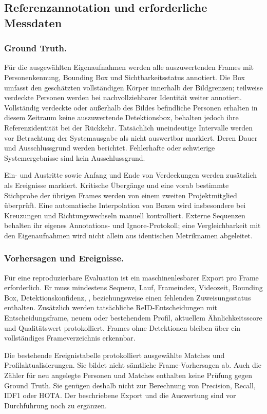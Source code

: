 \documentclass[runningheads]{llncs}
\begin{document}
\subsection{Referenzannotation und erforderliche Messdaten}

\subsubsection{Ground Truth.}
Für die ausgewählten Eigenaufnahmen werden alle auszuwertenden Frames mit Personenkennung, Bounding Box und Sichtbarkeitsstatus annotiert. Die Box umfasst den geschätzten vollständigen Körper innerhalb der Bildgrenzen; teilweise verdeckte Personen werden bei nachvollziehbarer Identität weiter annotiert. Vollständig verdeckte oder außerhalb des Bildes befindliche Personen erhalten in diesem Zeitraum keine auszuwertende Detektionsbox, behalten jedoch ihre Referenzidentität bei der Rückkehr. Tatsächlich uneindeutige Intervalle werden vor Betrachtung der Systemausgabe als nicht auswertbar markiert. Deren Dauer und Ausschlussgrund werden berichtet. Fehlerhafte oder schwierige Systemergebnisse sind kein Ausschlussgrund.

Ein- und Austritte sowie Anfang und Ende von Verdeckungen werden zusätzlich als Ereignisse markiert. Kritische Übergänge und eine vorab bestimmte Stichprobe der übrigen Frames werden von einem zweiten Projektmitglied überprüft. Eine automatische Interpolation von Boxen wird insbesondere bei Kreuzungen und Richtungswechseln manuell kontrolliert. Externe Sequenzen behalten ihr eigenes Annotations- und Ignore-Protokoll; eine Vergleichbarkeit mit den Eigenaufnahmen wird nicht allein aus identischen Metriknamen abgeleitet.

\subsubsection{Vorhersagen und Ereignisse.}
Für eine reproduzierbare Evaluation ist ein maschinenlesbarer Export pro Frame erforderlich. Er muss mindestens Sequenz, Lauf, Frameindex, Videozeit, Bounding Box, Detektionskonfidenz, ,  beziehungsweise einen fehlenden Zuweisungsstatus enthalten. Zusätzlich werden tatsächliche ReID-Entscheidungen mit Entscheidungsframe, neuem oder bestehendem Profil, aktuellem Ähnlichkeitsscore und Qualitätswert protokolliert. Frames ohne Detektionen bleiben über ein vollständiges Frameverzeichnis erkennbar.

Die bestehende Ereignistabelle protokolliert ausgewählte Matches und Profilaktualisierungen. Sie bildet nicht sämtliche Frame-Vorhersagen ab. Auch die Zähler für neu angelegte Personen und Matches enthalten keine Prüfung gegen Ground Truth. Sie genügen deshalb nicht zur Berechnung von Precision, Recall, IDF1 oder HOTA. Der beschriebene Export und die Auswertung sind vor Durchführung noch zu ergänzen.
\end{document}
